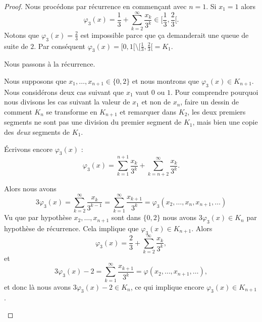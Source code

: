 \begin{proof}
	Nous procédons par récurrence en commençant avec \( n=1\). Si \( x_1=1\) alors
	\begin{equation}
		\varphi_3(x)=\frac{1}{ 3 }+\sum_{k=2}^{\infty}\frac{ x_k }{ 3^k }\in\mathopen[ \frac{1}{ 3 } , \frac{ 2 }{ 3 } [.
	\end{equation}
	Notons que \( \varphi_3(x)=\frac{ 2 }{ 3 }\) est impossible parce que ça demanderait une queue de suite de \( 2\). Par conséquent \( \varphi_3(x)=\mathopen[ 0 , 1 [\setminus\mathopen[ \frac{1}{ 3 } , \frac{ 2 }{ 3 } [=K_1\).

	Nous passons à la récurrence.

	\begin{subproof}

		Nous supposons que \( x_1,\ldots, x_{n+1}\in\{ 0,2 \}\) et nous montrons que \( \varphi_3(x)\in K_{n+1}\). Nous considérons deux cas suivant que \( x_1\) vaut \( 0\) ou \( 1\).  Pour comprendre pourquoi nous divisons les cas suivant la valeur de \( x_1\) et non de \( x_n\), faire un dessin de comment \( K_n\) se transforme en \( K_{n+1}\) et remarquer dans \( K_2\), les deux premiers segments ne sont pas une division du premier segment de \( K_1\), mais bien une copie des \emph{deux} segments de \( K_1\).

		Écrivons encore \( \varphi_3(x)\) :
		\begin{equation}
			\varphi_3(x)=\sum_{k=1}^{n+1}\frac{ x_k }{ 3^k }+\sum_{k=n+2}^{\infty}\frac{ x_k }{ 3^k }.
		\end{equation}
		\begin{subproof}
			\spitem[Si \( x_1=0\)]
			Alors nous avons
			\begin{equation}
				3\varphi_3(x)=\sum_{k=2}^{\infty}\frac{ x_k }{ 3^{k-1} }=\sum_{k=1}^{\infty}\frac{ x_{k+1} }{ 3^k }=\varphi_3(x_2,\ldots, x_n,x_{n+1},\ldots)
			\end{equation}
			Vu que par hypothèse \( x_2,\ldots, x_{n+1}\) sont dans \( \{ 0,2 \}\) nous avons \( 3\varphi_3(x)\in K_n\) par hypothèse de récurrence. Cela implique que \( \varphi_3(x)\in K_{n+1}\).
			\spitem[Si \( x_1=2\)]
			Alors
			\begin{equation}
				\varphi_3(x)=\frac{ 2 }{ 3 }+\sum_{k=2}^{\infty}\frac{ x_k }{ 3^k },
			\end{equation}
			et
			\begin{equation}
				3\varphi_3(x)-2=\sum_{k=1}^{\infty}\frac{ x_{k+1} }{ 3^k }=\varphi(x_2,\ldots, x_{n+1},\ldots),
			\end{equation}
			et donc là nous avons \( 3\varphi_3(x)-2\in K_n\), ce qui implique encore \( \varphi_3(x)\in K_{n+1}\).
		\end{subproof}


\end{subproof}
\end{proof}
